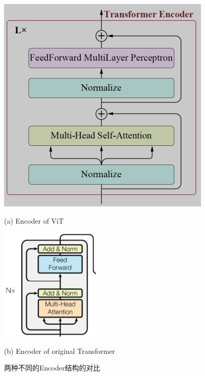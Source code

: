 \documentclass[AutoFakeBold]{MyFormat}
\begin{document}
\begin{figure}[htbp]
    \centering
    \begin{minipage}[t]{0.4\linewidth}
        \centering
        \includegraphics[width=\textwidth]{figures/2022.07.31/ViT_Encoder.png}
        \centerline{(a) Encoder of ViT}
    \end{minipage}
    \begin{minipage}[t]{0.4\linewidth}
        \centering
        \includegraphics[width=\textwidth]{figures/2022.07.31/original_Encoder.png}
        \centerline{(b) Encoder of original Transformer}
    \end{minipage}
    \caption{两种不同的Encoder结构的对比}
\end{figure}
\end{document}
